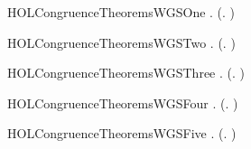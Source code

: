 \newcommand{\HOLCongruenceTheoremsWGXXstrongind}{\UseVerbatim{HOLCongruenceTheoremsWGXXstrongind}}
\begin{SaveVerbatim}{HOLCongruenceTheoremsWGSOne}
\HOLTokenTurnstile{} \HOLSymConst{\HOLTokenForall{}}.  (\HOLTokenLambda{}. )
\end{SaveVerbatim}
\newcommand{\HOLCongruenceTheoremsWGSOne}{\UseVerbatim{HOLCongruenceTheoremsWGSOne}}
\begin{SaveVerbatim}{HOLCongruenceTheoremsWGSTwo}
\HOLTokenTurnstile{} \HOLSymConst{\HOLTokenForall{}}.  (\HOLTokenLambda{}. )
\end{SaveVerbatim}
\newcommand{\HOLCongruenceTheoremsWGSTwo}{\UseVerbatim{HOLCongruenceTheoremsWGSTwo}}
\begin{SaveVerbatim}{HOLCongruenceTheoremsWGSThree}
\HOLTokenTurnstile{} \HOLSymConst{\HOLTokenForall{}} .   \HOLSymConst{\HOLTokenImp{}}  (\HOLTokenLambda{}.  )
\end{SaveVerbatim}
\newcommand{\HOLCongruenceTheoremsWGSThree}{\UseVerbatim{HOLCongruenceTheoremsWGSThree}}
\begin{SaveVerbatim}{HOLCongruenceTheoremsWGSFour}
\HOLTokenTurnstile{} \HOLSymConst{\HOLTokenForall{}}   .
         \HOLSymConst{\HOLTokenConj{}}   \HOLSymConst{\HOLTokenImp{}}  (\HOLTokenLambda{}.   \HOLSymConst{\ensuremath{+}}  )
\end{SaveVerbatim}
\newcommand{\HOLCongruenceTheoremsWGSFour}{\UseVerbatim{HOLCongruenceTheoremsWGSFour}}
\begin{SaveVerbatim}{HOLCongruenceTheoremsWGSFive}
\HOLTokenTurnstile{} \HOLSymConst{\HOLTokenForall{}} .   \HOLSymConst{\HOLTokenConj{}}   \HOLSymConst{\HOLTokenImp{}}  (\HOLTokenLambda{}.   \HOLSymConst{\ensuremath{\parallel}}  )
\end{SaveVerbatim}
